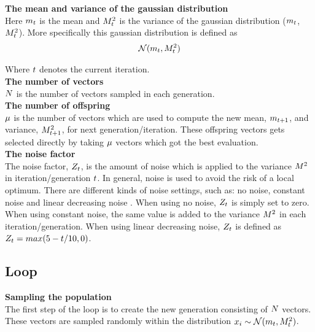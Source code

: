 \textbf{The mean and variance of the gaussian distribution} \\
Here $m_{t}$ is the mean and  
$M^2_{t}$ is the variance 
of the gaussian distribution ($m_{t}$,
$M^2_{t}$). 
More specifically this gaussian distribution is defined as 
\begin{align*}
\mathcal{N}(m_{t},M^2_{t})
\end{align*}

Where $t$ denotes the current iteration.\\


\textbf{The number of vectors}\\
$N$ is the number of vectors sampled in each generation.
\\

\textbf{The number of offspring}\\
$\mu$ is the number of vectors which are used to compute 
the new mean, $m_{t + 1}$, and variance,
$M^2_{t + 1}$, for next generation/iteration. 
These offspring vectors gets selected 
directly by taking $\mu$ vectors
which got the best evaluation.
\\

\textbf{The noise factor}\\
The noise factor, $Z_{t}$, is the amount of noise which 
is applied to the variance $M^2$ in iteration/generation 
$t$. In general, noise is used to avoid the risk of a local optimum.
There are different kinds of noise settings, such as: no noise, constant noise 
and linear decreasing noise \citep{szita:06}. 
When using no noise, $Z_{t}$ 
is simply set to zero. When using constant noise, the same value is 
added to the variance $M^2$ in each iteration/generation. 
When using linear decreasing noise, $Z_{t}$ is defined as
$Z_{t}=max(5- t /10,0)$.
\\

\subsection{Loop}

\textbf{Sampling the population}\\
The first step of the loop is to create the new generation consisting of $N$ vectors. These vectors are sampled randomly within the distribution $x_{i}\sim \mathcal{N}(m_{t},M^2_{t})$.
\\

